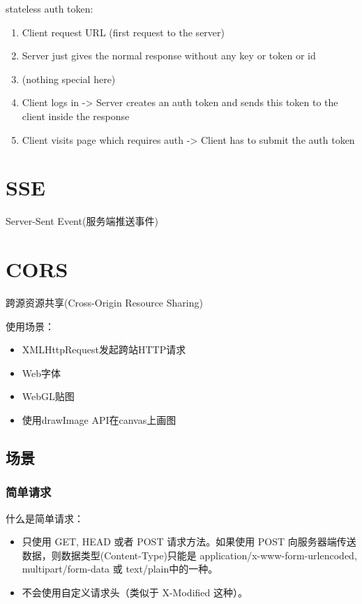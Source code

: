 stateless auth token:

\begin{enumerate}
\item Client request URL (first request to the server)
\item Server just gives the normal response without any key or token or id
\item (nothing special here)
\item Client logs in -> Server creates an auth token and sends this token to the client inside the response
\item Client visits page which requires auth -> Client has to submit the auth token
\end{enumerate}


\section{SSE} Server-Sent Event(服务端推送事件)

\section{CORS} 跨源资源共享(Cross-Origin Resource Sharing)

使用场景：
\begin{itemize}
\item XMLHttpRequest发起跨站HTTP请求
\item Web字体
\item WebGL贴图
\item 使用drawImage API在canvas上画图
\end{itemize}


\subsection{场景}

\subsubsection*{简单请求}

什么是简单请求：
\begin{itemize}
\item 只使用 GET, HEAD 或者 POST 请求方法。如果使用 POST 向服务器端传送数据，则数据类型(Content-Type)只能是 application/x-www-form-urlencoded, multipart/form-data 或 text/plain中的一种。
\item 不会使用自定义请求头（类似于 X-Modified 这种）。
\end{itemize}

